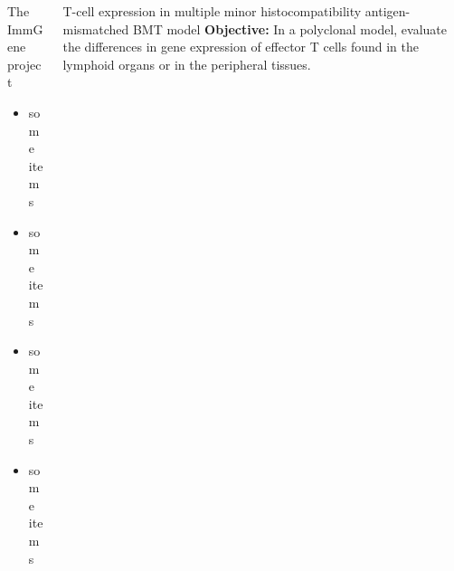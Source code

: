 \documentclass[final,hyperref={pdfpagelabels=false}]{beamer}
\begin{document}
\begin{frame}{}
\begin{columns}[t]
\begin{column}{.25\linewidth}
        \begin{block}{The ImmGene project}
          \begin{itemize}
          \item some items
          \item some items
          \item some items
          \item some items
          \end{itemize}
        \end{block}

      \end{column}


      \begin{column}{.24\linewidth}
        \begin{block}{T-cell expression in multiple minor histocompatibility antigen-mismatched BMT model}
	  {\bf Objective:} In a polyclonal model, evaluate the differences in gene expression of effector T cells found in the lymphoid organs or in the peripheral tissues.


\end{block}
\end{column}
\end{columns}
\end{frame}
\end{document}
